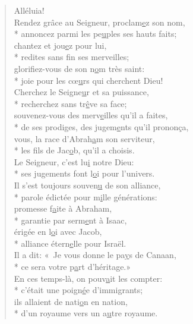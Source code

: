 \begin{verse}
Alléluia! \\

Rendez grâce au Seigneur, proclam\underline{e}z son nom, \\*
annoncez parmi les pe\underline{u}ples ses hauts faits; \\
chantez et jou\underline{e}z pour lui, \\*
redites sans f\underline{i}n ses merveilles; \\
glorifiez-vous de son n\underline{o}m très saint: \\*
joie pour les cœ\underline{u}rs qui cherchent Dieu! \\

Cherchez le Seigne\underline{u}r et sa puissance, \\*
recherchez sans tr\underline{ê}ve sa face; \\
souvenez-vous des merv\underline{e}illes qu’il a faites, \\*
de ses prodiges, des jugem\underline{e}nts qu’il prononça, \\
vous, la race d’Abrah\underline{a}m son serviteur, \\*
les fils de Jac\underline{o}b, qu’il a choisis. \\

Le Seigneur, c’est lu\underline{i} notre Dieu: \\*
ses jugements font l\underline{o}i pour l’univers. \\
Il s’est toujours souven\underline{u} de son alliance, \\*
parole édictée pour m\underline{i}lle générations: \\

promesse f\underline{a}ite à Abraham, \\*
garantie par serm\underline{e}nt à Isaac, \\
érigée en l\underline{o}i avec Jacob, \\*
alliance étern\underline{e}lle pour Israël. \\

Il a dit: « Je vous donne le pa\underline{y}s de Canaan, \\*
ce sera votre p\underline{a}rt d’héritage.» \\

En ces temps-là, on pouv\underline{a}it les compter: \\*
c’était une poign\underline{é}e d’immigrants; \\
ils allaient de nati\underline{o}n en nation, \\*
d’un royaume vers un a\underline{u}tre royaume. \\


\end{verse}
